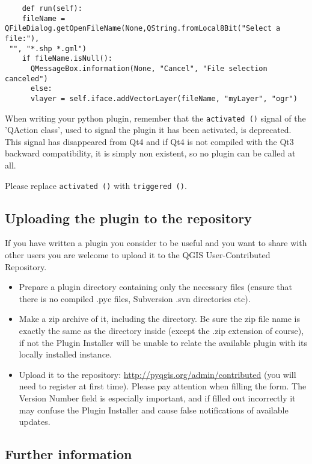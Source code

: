 \begin{verbatim}
    def run(self):
    fileName = QFileDialog.getOpenFileName(None,QString.fromLocal8Bit("Select a file:"),
 "", "*.shp *.gml")
    if fileName.isNull():
      QMessageBox.information(None, "Cancel", "File selection canceled")
      else:
      vlayer = self.iface.addVectorLayer(fileName, "myLayer", "ogr")
\end{verbatim}


When writing your python plugin, remember that the \texttt{activated ()}
signal of the 'QAction class', used to signal the plugin it has been
activated, is deprecated. This signal has disappeared from Qt4 and if Qt4 is
not compiled with the Qt3 backward compatibility, it is simply non existent,
so no plugin can be called at all.

Please replace \texttt{activated ()} with \texttt{triggered ()}.

\subsection{Uploading the plugin to the repository}

If you have written a plugin you consider to be useful and you want to share with
other users you are welcome to upload it to the QGIS User-Contributed Repository.
\begin{itemize}
\item Prepare a plugin directory containing only the necessary files (ensure that there
is no compiled .pyc files, Subversion .svn directories etc).
\item Make a zip archive of it, including the directory. Be sure the zip file
name is exactly the same as the directory inside (except the .zip extension of course), if not 
the Plugin Installer will be unable to relate the available plugin with its 
locally installed instance.
\item Upload it to the repository: \url{http://pyqgis.org/admin/contributed} (you
will need to register at first time). Please pay attention when filling the form.
The Version Number field is especially important, and if filled out incorrectly it may confuse the Plugin Installer and cause false notifications of available updates.
\end{itemize}

\subsection{Further information}

